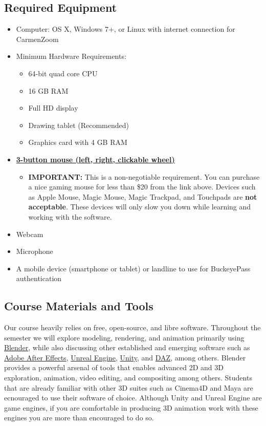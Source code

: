 \subsection{Required Equipment}

\begin{itemize}
      \tightlist
      \item Computer: OS X, Windows 7+, or Linux with internet connection for CarmenZoom
      \item Minimum Hardware Requirements:
            \begin{itemize}
                  \item 64-bit quad core CPU
                  \item 16 GB RAM
                  \item Full HD display
                  \item Drawing tablet (Recommended)
                  \item Graphics card with 4 GB RAM
            \end{itemize}
      \item \href{https://www.amazon.com/s?k=gaming+mouse&rh=p_36%3A-2000&qid=1610058878&rnid=386453011&ref=sr_nr_p_36_5}{\textbf{3-button mouse (left, right, clickable wheel)}}
            \begin{itemize}
                  \item \textbf{IMPORTANT:} This is a non-negotiable requirement. You can purchase a nice gaming mouse for less than \$20 from the link above. Devices such as Apple Mouse, Magic Mouse, Magic Trackpad, and Touchpads are \textbf{not acceptable}. These devices will only slow you down while learning and working with the software.
            \end{itemize}
      \item Webcam
      \item Microphone
      \item A mobile device (smartphone or tablet) or landline to use for BuckeyePass authentication
\end{itemize}

\subsection{Course Materials and Tools}

Our course heavily relies on free, open-source, and libre software. Throughout the semester we will explore modeling, rendering, and animation primarily using \href{http://blender.org/}{Blender}, while also discussing other established and emerging software such as \href{https://www.adobe.com/products/aftereffects.html}{Adobe After Effects}, \href{https://www.unrealengine.com/en-US/}{Unreal Engine}, \href{https://unity.com/}{Unity}, and \href{https://www.daz3d.com/}{DAZ}, among others. Blender provides a powerful arsenal of tools that enables advanced 2D and 3D exploration, animation, video editing, and compositing among others. Students that are already familiar with other 3D suites such as Cinema4D and Maya are ecnouraged to use their software of choice. Although Unity and Unreal Engine are game engines, if you are comfortable in producing 3D animation work with these engines you are more than encouraged to do so.

